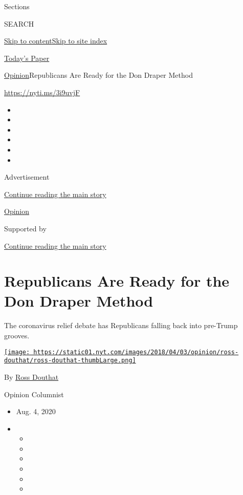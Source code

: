 Sections

SEARCH

\protect\hyperlink{site-content}{Skip to
content}\protect\hyperlink{site-index}{Skip to site index}

\href{https://myaccount.nytimes.com/auth/login?response_type=cookie\&client_id=vi}{}

\href{https://www.nytimes.com/section/todayspaper}{Today's Paper}

\href{/section/opinion}{Opinion}\textbar{}Republicans Are Ready for the
Don Draper Method

\href{https://nyti.ms/3i9uvjF}{https://nyti.ms/3i9uvjF}

\begin{itemize}
\item
\item
\item
\item
\item
\item
\end{itemize}

Advertisement

\protect\hyperlink{after-top}{Continue reading the main story}

\href{/section/opinion}{Opinion}

Supported by

\protect\hyperlink{after-sponsor}{Continue reading the main story}

\hypertarget{republicans-are-ready-for-the-don-draper-method}{%
\section{Republicans Are Ready for the Don Draper
Method}\label{republicans-are-ready-for-the-don-draper-method}}

The coronavirus relief debate has Republicans falling back into
pre-Trump grooves.

\href{https://www.nytimes.com/by/ross-douthat}{\texttt{[image: https://static01.nyt.com/images/2018/04/03/opinion/ross-douthat/ross-douthat-thumbLarge.png]}}

By \href{https://www.nytimes.com/by/ross-douthat}{Ross Douthat}

Opinion Columnist

\begin{itemize}
\item
  Aug. 4, 2020
\item
  \begin{itemize}
  \item
  \item
  \item
  \item
  \item
  \item
  \end{itemize}
\end{itemize}

